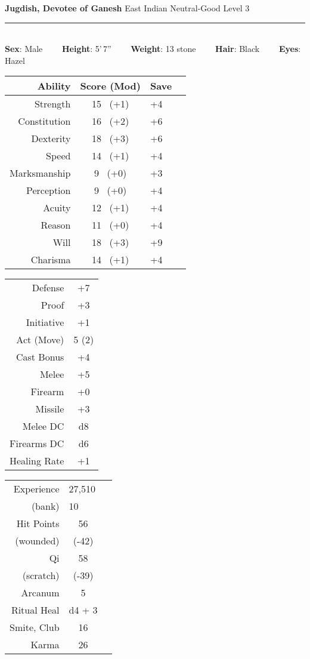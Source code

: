 \documentclass[11pt]{article}
\newcommand{\heading}[1]{{\sc\bfseries #1}}
\begin{document}
\pagestyle{empty}
\noindent
{\huge\bfseries Jugdish, Devotee of Ganesh}
\hfill
{\Large East Indian}
\hfill
{\Large Neutral-Good}
\hfill
{\Large Level 3}
\\[-8pt]
\hrule

\mbox{ }
\\[6pt]
\heading{Sex}: Male
\ \ \ \
\heading{Height}: 5'\,7''
\ \ \ \
\heading{Weight}: 13 stone
\ \ \ \
\heading{Hair}: Black
\ \ \ \
\heading{Eyes}: Hazel

\noindent
\begin{tabular}[t]{|r|c|l|c|}
\hline
\heading{Ability}
& \heading{Score (Mod)}
& \heading{Save}
\\ \hline \hline
\sc Strength & 15 \ (+1)
& +4
\\
\sc Constitution & 16 \ (+2)
& +6
\\ \hline
\sc Dexterity & 18 \ (+3)
& +6
\\
\sc Speed & 14 \ (+1)
& +4
\\ \hline
\sc Marksmanship & 9 \ (+0)
& +3
\\
\sc Perception & 9 \ (+0)
& +4
\\
\sc Acuity & 12 \ (+1)
& +4
\\ \hline
\sc Reason & 11 \ (+0)
& +4
\\
\sc Will & 18 \ (+3)
& +9
\\
\sc Charisma & 14 \ (+1)
& +4
\\ \hline
\end{tabular}
\hfill
\begin{tabular}[t]{|r|c|}
\hline
\sc Defense & +7
\\
\sc Proof & +3
\\ \hline
\sc Initiative & +1
\\
\sc Act (Move) & 5 (2)
\\  \hline
\sc Cast Bonus & +4
\\ \hline
\sc Melee & +5
\\
\sc Firearm & +0
\\
\sc Missile & +3
\\ \hline
\sc Melee DC & d8
\\
\sc Firearms DC & d6
\\ \hline
\sc Healing Rate & +1
\\ \hline
\end{tabular}
%
\hfill
%
\begin{tabular}[t]{|r|c|c|}
\hline
\sc Experience & \multicolumn{2}{|l|}{27,510}
\\
(bank) & \multicolumn{2}{|l|}{10}
\\ \hline
\sc Hit Points & 56 & \hspace*{8em}
\\
(wounded) & (-42) &
\\[2pt] \hline
\sc Qi &  58 &
\\ (scratch) & (-39) &
\\[2pt] \hline
\sc Arcanum & 5 &
\\[2pt] \hline
\sc Ritual Heal & d4 + 3 &
\\[2pt] \hline
\sc Smite, Club & 16 &
\\[2pt] \hline
\sc Karma & 26 &
\\ \hline
\end{tabular}
\end{document}
